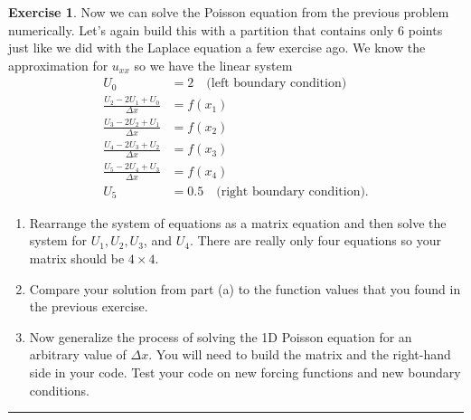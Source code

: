 \documentclass[
]{book}
\providecommand{\tightlist}{%
  \setlength{\itemsep}{0pt}\setlength{\parskip}{0pt}}
\theoremstyle{definition}
\theoremstyle{definition}
\theoremstyle{definition}
\newtheorem{exercise}{Exercise}[chapter]
\theoremstyle{remark}
\begin{document}
\begin{exercise}
\protect\hypertarget{exr:unnamed-chunk-601}{}{\label{exr:unnamed-chunk-601} }Now we can solve the Poisson equation from the previous problem numerically. Let's again build this with a partition that contains only 6 points just like we did with the Laplace equation a few exercise ago. We know the approximation for \(u_{xx}\) so we have the linear system
\[\begin{aligned}
U_0 &= 2 \quad \text{(left boundary condition)}\\
\frac{U_2 - 2U_1 + U_0}{\Delta x} &= f(x_1) \\ 
\frac{U_3 - 2U_2 + U_1}{\Delta x} &= f(x_2) \\ 
\frac{U_4 - 2U_3 + U_2}{\Delta x} &= f(x_3) \\ 
\frac{U_5 - 2U_4 + U_3}{\Delta x} &= f(x_4) \\ 
U_5 &= 0.5 \quad \text{(right boundary condition).}
\end{aligned}\]

\begin{enumerate}
\def\labelenumi{\alph{enumi}.}
\tightlist
\item
  Rearrange the system of equations as a matrix equation and then solve the system for \(U_1, U_2, U_3\), and \(U_4\). There are really only four equations so your matrix should be \(4 \times 4\).
\item
  Compare your solution from part (a) to the function values that you found in the previous exercise.
\item
  Now generalize the process of solving the 1D Poisson equation for an arbitrary value of \(\Delta x\). You will need to build the matrix and the right-hand side in your code. Test your code on new forcing functions and new boundary conditions.
\end{enumerate}
\end{exercise}

\begin{center}\rule{0.5\linewidth}{0.5pt}\end{center}
\end{document}
